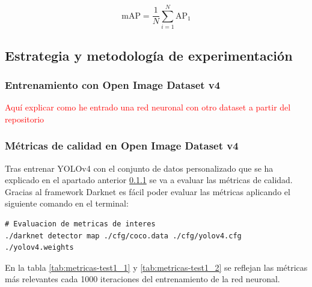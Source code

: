 \begin{equation}
\label{eq:map}
\text{mAP} = \frac{1}{N} \sum_{i=1}^{N} \text{AP}_{1}
\end{equation}

\subsection{Estrategia y metodología de experimentación}
\label{subsec:estrategia-metodologia}

\newpage

\subsubsection{Entrenamiento con Open Image Dataset v4}
\label{subsubsec:train-openimagesv4}

\textcolor{red}{Aquí explicar como he entrado una red neuronal con otro dataset a partir del repositorio \cite{OIDv4_ToolKit}}

\newpage

\subsubsection{Métricas de calidad en Open Image Dataset v4}
\label{subsubsec:metricas-calidad-openimagesv4}

Tras entrenar YOLOv4 con el conjunto de datos personalizado que se ha explicado en el apartado anterior \ref{subsubsec:train-openimagesv4} se va a evaluar las métricas de calidad. Gracias al framework Darknet \cite{darknet13} es fácil poder evaluar las métricas aplicando el siguiente comando en el terminal:

\vspace{0.5cm}
\begin{lstlisting}[language=iPython,caption=Evaluación métricas de calidad del conjunto de datos utilizado para el entrenamiento de la red neuronal de detección de objetos,captionpos=b,label={lst:darknet-map}]
# Evaluacion de metricas de interes
./darknet detector map ./cfg/coco.data ./cfg/yolov4.cfg ./yolov4.weights
\end{lstlisting}

En la tabla \ref{tab:metricas-test1_1} y \ref{tab:metricas-test1_2} se reflejan las métricas más relevantes cada 1000 iteraciones del entrenamiento de la red neuronal.


